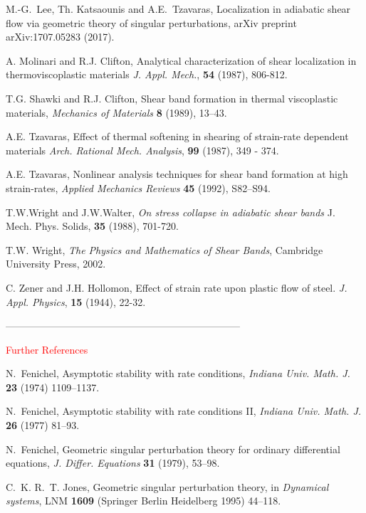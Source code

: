 \documentclass[a4paper,11pt]{article}
\newcommand{\tcr}{\textcolor{red}}
\theoremstyle{remark}
\begin{document}
\begin{thebibliography}{10}
{\sc M.-G.~Lee, Th. Katsaounis and A.E.~Tzavaras},
Localization in adiabatic shear flow via geometric theory of singular perturbations,
arXiv preprint arXiv:1707.05283 (2017).


{\sc A. Molinari and R.J. Clifton},
{ Analytical characterization of shear localization in thermoviscoplastic materials}
 {\it J. Appl. Mech.},  {\bf 54} (1987), 806-812.

{\sc T.G. Shawki and R.J. Clifton},
Shear band formation in thermal viscoplastic materials,
{\it Mechanics of Materials}
{\bf 8 } (1989), 13--43.

{\sc A.E. Tzavaras},
{Effect of thermal softening in shearing of strain-rate dependent materials}
{\it Arch. Rational Mech. Analysis}, {\bf 99} (1987), 349 - 374.

{\sc A.E. Tzavaras},
Nonlinear analysis techniques for shear band formation at high strain-rates,
 {\it Applied Mechanics Reviews}
{\bf  45} (1992), S82--S94.

{\sc T.W.Wright and J.W.Walter},
{\sl On stress collapse in adiabatic shear bands}
J. Mech. Phys. Solids, {\bf 35} (1988), 701-720.

{\sc T.W. Wright},
{\sl The Physics and Mathematics of Shear Bands},
Cambridge University Press, 2002.


{\sc  C. Zener and J.H. Hollomon},
{ Effect of strain rate upon plastic flow of steel.}
{\it J. Appl. Physics}, {\bf 15} (1944), 22-32.



-----------------------------------------------------------------------

\tcr{ Further References }



{\sc N.~Fenichel},
Asymptotic stability with rate conditions,
{\it Indiana Univ. Math. J.} {\bf 23} (1974) 1109--1137.

{\sc N.~Fenichel},
Asymptotic stability with rate conditions \textrm{II},
{\it Indiana Univ. Math. J.} {\bf 26} (1977) 81--93.

{\sc N.~Fenichel},
Geometric singular perturbation theory for ordinary differential equations,
{\it J. Differ. Equations} {\bf 31} (1979), 53--98.

 {\sc C.~K. R.~T. Jones},
 Geometric singular perturbation theory, in {\it Dynamical systems}, LNM {\bf 1609} (Springer Berlin Heidelberg 1995) 44--118.


\end{thebibliography}
\end{document}
